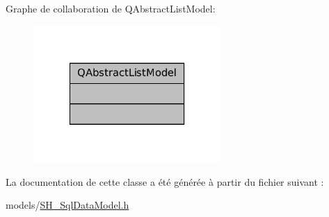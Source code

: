 Graphe de collaboration de Q\-Abstract\-List\-Model\-:
\nopagebreak
\begin{figure}[H]
\begin{center}
\leavevmode
\includegraphics[width=202pt]{classQAbstractListModel__coll__graph}
\end{center}
\end{figure}


La documentation de cette classe a été générée à partir du fichier suivant \-:\begin{DoxyCompactItemize}
\item 
models/\hyperlink{SH__SqlDataModel_8h}{S\-H\-\_\-\-Sql\-Data\-Model.\-h}\end{DoxyCompactItemize}
